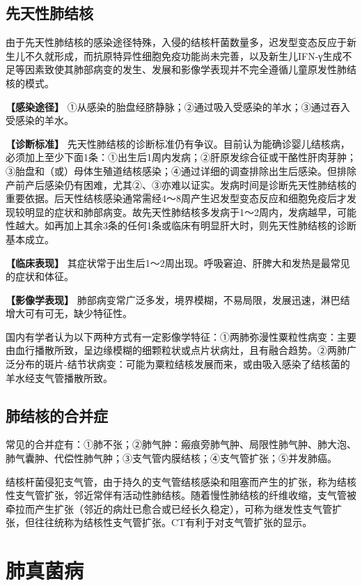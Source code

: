 \subsection{先天性肺结核}

由于先天性肺结核的感染途径特殊，入侵的结核杆菌数量多，迟发型变态反应于新生儿不久就形成，而抗原特异性细胞免疫功能尚未完善，以及新生儿IFN-γ生成不足等因素致使其肺部病变的发生、发展和影像学表现并不完全遵循儿童原发性肺结核的模式。

\textbf{【感染途径】}
①从感染的胎盘经脐静脉；②通过吸入受感染的羊水；③通过吞入受感染的羊水。

\textbf{【诊断标准】}
先天性肺结核的诊断标准仍有争议。目前认为能确诊婴儿结核病，必须加上至少下面1条：①出生后1周内发病；②肝原发综合征或干酪性肝肉芽肿；③胎盘和（或）母体生殖道结核感染；④通过详细的调查排除出生后感染。但排除产前产后感染仍有困难，尤其②、③亦难以证实。发病时间是诊断先天性肺结核的重要依据。后天性结核感染通常需经4～8周产生迟发型变态反应和细胞免疫后才发现较明显的症状和肺部病变。故先天性肺结核多发病于1～2周内，发病越早，可能性越大。如再加上其余3条的任何1条或临床有明显肝大时，则先天性肺结核的诊断基本成立。

\textbf{【临床表现】}
其症状常于出生后1～2周出现。呼吸窘迫、肝脾大和发热是最常见的症状和体征。

\textbf{【影像学表现】}
肺部病变常广泛多发，境界模糊，不易局限，发展迅速，淋巴结增大可有可无，缺少特征性。

国内有学者认为以下两种方式有一定影像学特征：①两肺弥漫性粟粒性病变：主要由血行播散所致，呈边缘模糊的细颗粒状或点片状病灶，且有融合趋势。②两肺广泛分布的斑片-结节状病变：可能为粟粒结核发展而来，或由吸入感染了结核菌的羊水经支气管播散所致。

\subsection{肺结核的合并症}

常见的合并症有：①肺不张；②肺气肿：瘢痕旁肺气肿、局限性肺气肿、肺大泡、肺气囊肿、代偿性肺气肿；③支气管内膜结核；④支气管扩张；⑤并发肺癌。

结核杆菌侵犯支气管，由于持久的支气管结核感染和阻塞而产生的扩张，称为结核性支气管扩张，邻近常伴有活动性肺结核。随着慢性肺结核的纤维收缩，支气管被牵拉而产生扩张（邻近的病灶已愈合或已经长久稳定），可称为继发性支气管扩张，但往往统称为结核性支气管扩张。CT有利于对支气管扩张的显示。

\section{肺真菌病}

